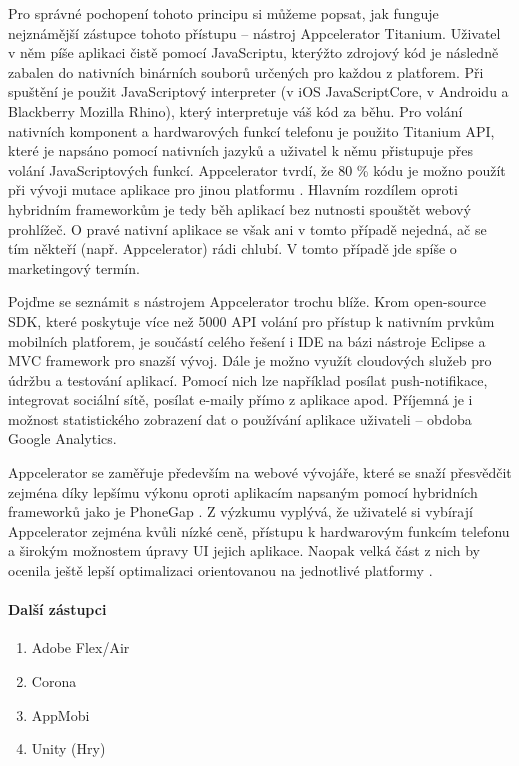 Pro správné pochopení tohoto principu si můžeme popsat, jak funguje nejznámější zástupce tohoto přístupu – nástroj Appcelerator Titanium. Uživatel v něm píše aplikaci čistě pomocí JavaScriptu, kterýžto zdrojový kód je následně zabalen do nativních binárních souborů určených pro každou z platforem. Při spuštění je použit JavaScriptový interpreter (v iOS JavaScriptCore, v Androidu a Blackberry Mozilla Rhino), který interpretuje váš kód za běhu. Pro volání nativních komponent a hardwarových funkcí telefonu je použito Titanium API, které je napsáno pomocí nativních jazyků a uživatel k němu přistupuje přes volání JavaScriptových funkcí. Appcelerator tvrdí, že 80 \% kódu je možno použít při vývoji mutace aplikace pro jinou platformu \cite{building_apps_titanium}. Hlavním rozdílem oproti hybridním frameworkům je tedy běh aplikací bez nutnosti spouštět webový prohlížeč. O pravé nativní aplikace se však ani v tomto případě nejedná, ač se tím někteří (např. Appcelerator) rádi chlubí. V tomto případě jde spíše o marketingový termín.

Pojďme se seznámit s nástrojem Appcelerator trochu blíže. Krom open-source SDK, které poskytuje více než 5000 API volání pro přístup k nativním prvkům mobilních platforem, je součástí celého řešení i IDE na bázi nástroje Eclipse a MVC framework pro snazší vývoj. Dále je možno využít cloudových služeb pro údržbu a testování aplikací. Pomocí nich lze například posílat push-notifikace, integrovat sociální sítě, posílat e-maily přímo z aplikace apod. Příjemná je i možnost statistického zobrazení dat o používání aplikace uživateli – obdoba Google Analytics. \cite{appcelerator_features} 

Appcelerator se zaměřuje především na webové vývojáře, které se snaží přesvědčit zejména díky lepšímu výkonu oproti aplikacím napsaným pomocí hybridních frameworků jako je PhoneGap \cite{appcelerator_vs_phonegap}. Z výzkumu vyplývá, že uživatelé si vybírají Appcelerator zejména kvůli nízké ceně, přístupu k hardwarovým funkcím telefonu a širokým možnostem úpravy UI jejich aplikace. Naopak velká část z nich by ocenila ještě lepší optimalizaci orientovanou na jednotlivé platformy \cite{visionmobile_survey}.

\paragraph{Další zástupci}
\begin{enumerate}
	\item Adobe Flex/Air
	\item Corona
	\item AppMobi
	\item Unity (Hry)
\end{enumerate}

